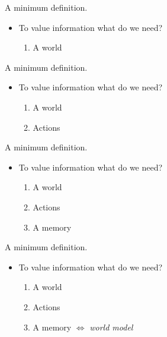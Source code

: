 \documentclass[10pt]{beamer}
\begin{document}
\begin{frame}[fragile]{A minimum definition.}
\begin{itemize}
    \item To value information what do we need?
    \begin{enumerate}
        \item A world
    \end{enumerate}
\end{itemize}
\end{frame}

\begin{frame}[fragile]{A minimum definition.}
\begin{itemize}
    \item To value information what do we need?
    \begin{enumerate}
        \item A world
        \item Actions
    \end{enumerate}
\end{itemize}
\end{frame}

\begin{frame}[fragile]{A minimum definition.}
\begin{itemize}
    \item To value information what do we need?
    \begin{enumerate}
        \item A world
        \item Actions
        \item A memory
    \end{enumerate}
\end{itemize}
\end{frame}

\begin{frame}[fragile]{A minimum definition.}
\begin{itemize}
    \item To value information what do we need?
    \begin{enumerate}
        \item A world
        \item Actions
        \item A memory $\Leftrightarrow$ \textit{world model}
    \end{enumerate}
\end{itemize}
\end{frame}
\end{document}
